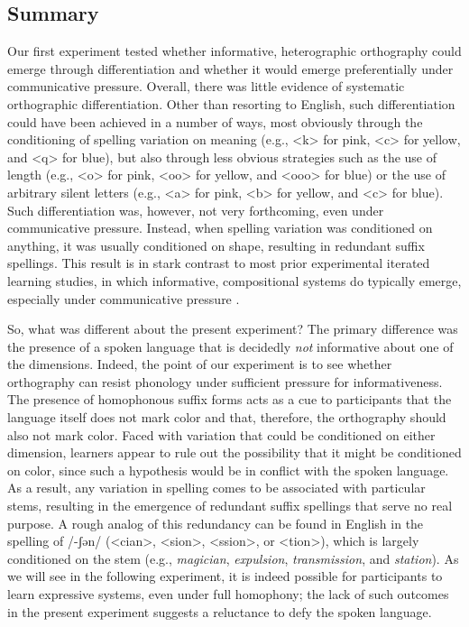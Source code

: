 \documentclass[doc,biblatex]{apa7}
\begin{document}
\subsection{Summary}

Our first experiment tested whether informative, heterographic orthography could emerge through differentiation and whether it would emerge preferentially under communicative pressure. Overall, there was little evidence of systematic orthographic differentiation. Other than resorting to English, such differentiation could have been achieved in a number of ways, most obviously through the conditioning of spelling variation on meaning (e.g., <k> for pink, <c> for yellow, and <q> for blue), but also through less obvious strategies such as the use of length (e.g., <o> for pink, <oo> for yellow, and <ooo> for blue) or the use of arbitrary silent letters (e.g., <a> for pink, <b> for yellow, and <c> for blue). Such differentiation was, however, not very forthcoming, even under communicative pressure. Instead, when spelling variation was conditioned on anything, it was usually conditioned on shape, resulting in redundant suffix spellings. This result is in stark contrast to most prior experimental iterated learning studies, in which informative, compositional systems do typically emerge, especially under communicative pressure \parencite[e.g.,][]{Kirby:2015}.

So, what was different about the present experiment? The primary difference was the presence of a spoken language that is decidedly \textit{not} informative about one of the dimensions. Indeed, the point of our experiment is to see whether orthography can resist phonology under sufficient pressure for informativeness. The presence of homophonous suffix forms acts as a cue to participants that the language itself does not mark color and that, therefore, the orthography should also not mark color. Faced with variation that could be conditioned on either dimension, learners appear to rule out the possibility that it might be conditioned on color, since such a hypothesis would be in conflict with the spoken language. As a result, any variation in spelling comes to be associated with particular stems, resulting in the emergence of redundant suffix spellings that serve no real purpose. A rough analog of this redundancy can be found in English in the spelling of /-ʃən/ (<cian>, <sion>, <ssion>, or <tion>), which is largely conditioned on the stem (e.g., \textit{magician}, \textit{expulsion}, \textit{transmission}, and \textit{station}). As we will see in the following experiment, it is indeed possible for participants to learn expressive systems, even under full homophony; the lack of such outcomes in the present experiment suggests a reluctance to defy the spoken language.
\end{document}

